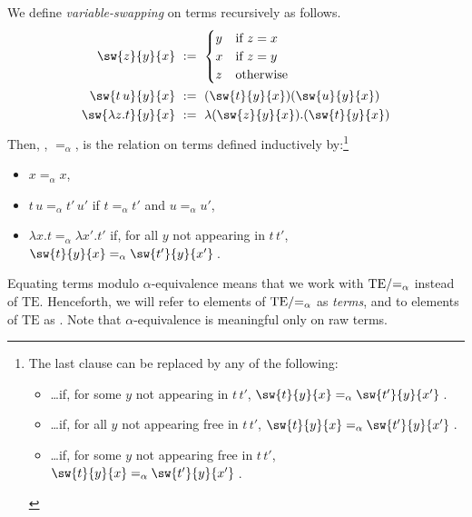 \documentclass[12pt]{article}
\begin{document}
\begin{mydefinition}
We define \emph{variable-swapping} on terms recursively as follows.
\begin{align*}
\sw{z}{y}{x}  \ &:=\ \begin{cases}y & \text{if }z=x \\ x & \text{if }z=y \\ z & \text{otherwise}\end{cases} \\
\sw{t\,u}{y}{x} \ &:=\ (\sw{t}{y}{x})(\sw{u}{y}{x}) \\
\sw{\lambda z. t}{y}{x} \ &:=\ \lambda(\sw{z}{y}{x}).(\sw{t}{y}{x})
\end{align*}
Then, , $=_\alpha$, is the relation on terms defined inductively by:\footnote{%
The last clause can be replaced by any of the following:
\begin{itemize}
    \item \dots if, for some $y$ not appearing in $t\,t'$, $\sw{t}{y}{x}=_\alpha \sw{t'}{y}{x'}$\,.
    \item \dots if, for all $y$ not appearing free in $t\,t'$, $\sw{t}{y}{x}=_\alpha \sw{t'}{y}{x'}$\,.
    \item \dots if, for some $y$ not appearing free in $t\,t'$, $\sw{t}{y}{x}=_\alpha \sw{t'}{y}{x'}$\,.
\end{itemize}}
%
\begin{itemize}
  \item $x=_{\alpha}x$,
  \item $t\,u=_{\alpha}t'\,u'$ if $t=_{\alpha}t'$ and $u=_{\alpha}u'$,
  \item $\lambda x.t=_\alpha\lambda x'.t'$ if,  for all $y$ not appearing in $t\,t'$, $\sw{t}{y}{x}=_\alpha \sw{t'}{y}{x'}$\,. \deq
\end{itemize}
\end{mydefinition}
%
Equating terms modulo $\alpha$-equivalence means that we work with $\mathrm{TE}/\mathnormal{=_\alpha}$ instead of $\mathrm{TE}$.
Henceforth, we will refer to elements of $\mathrm{TE}/\mathnormal{=_\alpha}$ as \emph{terms}, and to elements of $\mathrm{TE}$ as . Note that $\alpha$-equivalence is meaningful only on raw terms.
\end{document}
